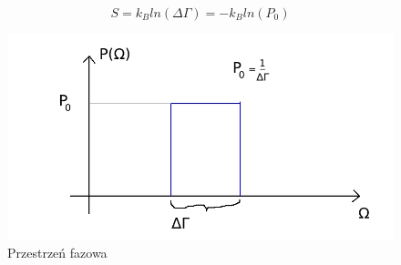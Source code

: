 \documentclass{article}
\begin{document}
		\begin{equation}
		S = k_Bln(\Delta \Gamma) = -k_Bln(P_0)
		\end{equation}
		\begin{figure}[ht]
			\label{fig:fig1}
			\centering
			\includegraphics[scale=0.5]{przestrzenoscylator.jpeg}
			\caption{Przestrzeń fazowa}
		\end{figure}
\end{document}
